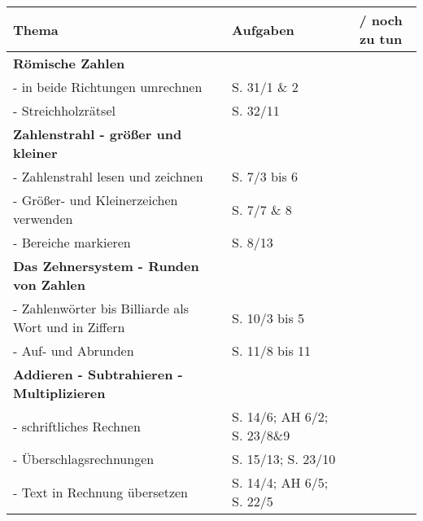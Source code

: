 \documentclass[a5paper,landscape]{scrartcl}
\begin{document}
\noindent
\begin{center}
\begin{tabular}{llc}
	\textbf{Thema} &  \textbf{Aufgaben} & \checkmark / noch zu tun\\
	\toprule
	\textbf{Römische Zahlen}  & \\
	- in beide Richtungen umrechnen & S. 31/1 \& 2\\
	- Streichholzrätsel & S. 32/11\\
	\midrule
	\textbf{Zahlenstrahl - größer und kleiner}  & \\
	- Zahlenstrahl lesen und zeichnen & S. 7/3 bis 6\\
	- Größer- und Kleinerzeichen verwenden & S. 7/7 \& 8\\
	- Bereiche markieren & S. 8/13\\
	\midrule
	\textbf{Das Zehnersystem - Runden von Zahlen} & \\
	- Zahlenwörter bis Billiarde als Wort und in Ziffern & S. 10/3 bis 5\\
	- Auf- und Abrunden & S. 11/8 bis 11\\
	\midrule
	\textbf{Addieren - Subtrahieren - Multiplizieren} & \\
	- schriftliches Rechnen & S. 14/6; AH 6/2; S. 23/8\&9\\
	- Überschlagsrechnungen &  S. 15/13; S. 23/10\\
	- Text in Rechnung übersetzen & S. 14/4; AH 6/5; S. 22/5\\
\end{tabular}
\end{center}
\end{document}
